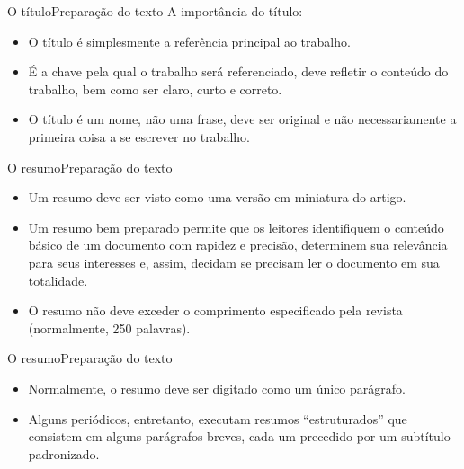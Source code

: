 \documentclass[t]{beamer}
\begin{document}


\begin{ftst}{O título}{Preparação do texto}
\justifying
A importância do título:
\vone
\begin{itemize}
    \item O título é simplesmente a referência principal ao trabalho.
    \item  É a chave pela qual o trabalho será referenciado, deve refletir o
    conteúdo do trabalho, bem como ser claro, curto e correto.
    \item  O título é um nome, não uma frase, deve ser original e não
    necessariamente a primeira coisa a se escrever no trabalho.
\end{itemize}


\end{ftst}


\begin{ftst}{O resumo}{Preparação do texto}
\justifying
\begin{itemize}
    \item Um resumo deve ser visto como uma versão em miniatura do artigo.
    \vone
    \item Um resumo bem preparado permite que os leitores identifiquem o conteúdo básico de um documento com rapidez e precisão, determinem sua relevância para seus interesses e, assim, decidam se precisam ler o documento em sua totalidade.
    \vone
    \item O resumo não deve exceder o comprimento especificado pela revista (normalmente, 250 palavras).
\end{itemize}

\end{ftst}


\begin{ftst}{O resumo}{Preparação do texto}
\justifying
\begin{itemize}
    \item Normalmente, o resumo deve ser digitado como um único parágrafo.
    \vone
    \item Alguns periódicos, entretanto, executam resumos “estruturados” que consistem em alguns parágrafos breves, cada um precedido por um subtítulo padronizado.
\end{itemize}

\end{ftst}

\end{document}
